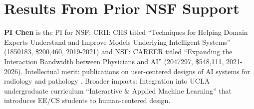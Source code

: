 \section{Results From Prior NSF Support}
{\bf PI Chen} is the PI for NSF: CRII: CHS titled “Techniques for Helping Domain Experts Understand and Improve Models Underlying Intelligent Systems” (1850183, \$200,460, 2019-2021) and NSF: CAREER titled “Expanding the Interaction Bandwidth between Physicians and AI” (2047297, \$548,111, 2021-2026). Intellectual merit: publications on user-centered designs of AI systems for radiology \cite{xie2020chexplain} and pathology \cite{gu2021lessons,gu2023improving,gu2023augmenting}. Broader impacts: Integration into UCLA undergraduate curriculum “Interactive \& Applied Machine Learning” that introduces EE/CS students to human-centered design.
